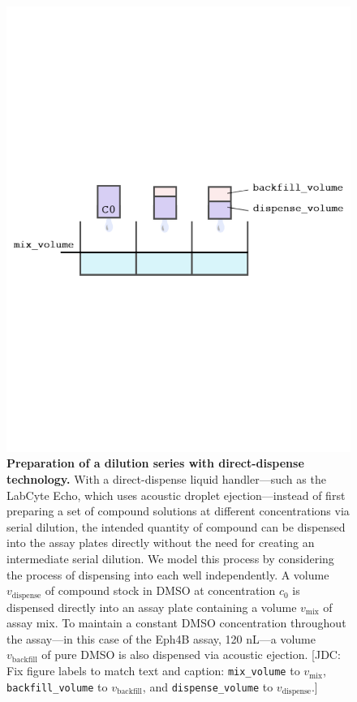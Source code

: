 \documentclass[aps,pre,twocolumn,nofootinbib,superscriptaddress,linenumbers]{revtex4-1}
\begin{document}
\begin{figure}[tb]
    \includegraphics[trim={0 9cm 0 9cm},clip,width=\columnwidth]{../figures/direct_dispense.pdf}

  \caption{{\bf Preparation of a dilution series with direct-dispense technology.}
  With a direct-dispense liquid handler---such as the LabCyte Echo, which uses acoustic droplet ejection---instead of first preparing a set of compound solutions at different concentrations via serial dilution, the intended quantity of compound can be dispensed into the assay plates directly without the need for creating an intermediate serial dilution.
  We model this process by considering the process of dispensing into each well independently.
  A volume $v_\mathrm{dispense}$ of compound stock in DMSO at concentration $c_0$ is dispensed directly into an assay plate containing a volume $v_\mathrm{mix}$ of assay mix.
  To maintain a constant DMSO concentration throughout the assay---in this case of the Eph4B assay, 120 nL---a volume $v_\mathrm{backfill}$ of pure DMSO is also dispensed via acoustic ejection.
  {\color{red}[JDC: Fix figure labels to match text and caption: {\tt mix\_volume} to $v_\mathrm{mix}$, {\tt backfill\_volume} to $v_\mathrm{backfill}$, and {\tt dispense\_volume} to $v_\mathrm{dispense}$.]}
  }
  \label{fig:direct_dispense}
\end{figure}
\end{document}
